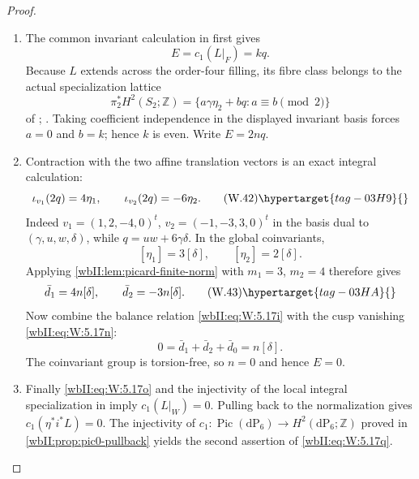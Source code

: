 \begin{proof}

\begin{enumerate}[label={$\langle1\rangle$\arabic*.},leftmargin=*]
\item The common invariant calculation in  first gives
\[
 E=c_1(L|_F)=kq.
\]
Because $L$ extends across the order-four filling, its fibre class belongs
to the actual specialization lattice
\[
 \pi_2^*H^2(S_2;\mathbb Z)
 =\{a\gamma\eta_2+bq:a\equiv b\pmod2\}
\]
of ; .  Taking
coefficient independence in the displayed invariant basis forces
$a=0$ and $b=k$; hence $k$ is even.  Write $E=2nq$.

\item Contraction with the two affine translation vectors is an exact integral
calculation:
\[
 \iota_{v_1}(2q)=4\eta_1,
 \qquad
 \iota_{v_2}(2q)=-6\eta_2.
\tag{W.42}\hypertarget{tag-03H9}{}\label{wbII:eq:W:5.17r}
\]
Indeed $v_1=(1,2,-4,0)^t$, $v_2=(-1,-3,3,0)^t$ in the basis dual to
$(\gamma,u,w,\delta)$, while
$q=uw+6\gamma\delta$.  In the global coinvariants,
\[
 [\eta_1]=3[\delta],\qquad [\eta_2]=2[\delta].
\]
Applying \cref{wbII:lem:picard-finite-norm} with $m_1=3$, $m_2=4$ therefore
gives
\[
 \bar d_1=4n[\delta],\qquad
 \bar d_2=-3n[\delta].
\tag{W.43}\hypertarget{tag-03HA}{}\label{wbII:eq:W:5.17s}
\]
Now combine the balance relation \eqref{wbII:eq:W:5.17i} with the cusp vanishing \eqref{wbII:eq:W:5.17n}:
\[
 0=\bar d_1+\bar d_2+\bar d_0=n[\delta].
\]
The coinvariant group is torsion-free, so $n=0$ and hence $E=0$.

\item Finally \eqref{wbII:eq:W:5.17o} and the injectivity of the local integral specialization in
 imply
$c_1(L|_W)=0$.  Pulling back to the normalization gives
$c_1(\eta^*i^*L)=0$.  The injectivity of
$c_1:\operatorname{Pic}(\mathrm{dP}_6)\to
H^2(\mathrm{dP}_6;\mathbb Z)$ proved in
\cref{wbII:prop:pic0-pullback} yields the second assertion of \eqref{wbII:eq:W:5.17q}.

\end{enumerate}
\end{proof}
